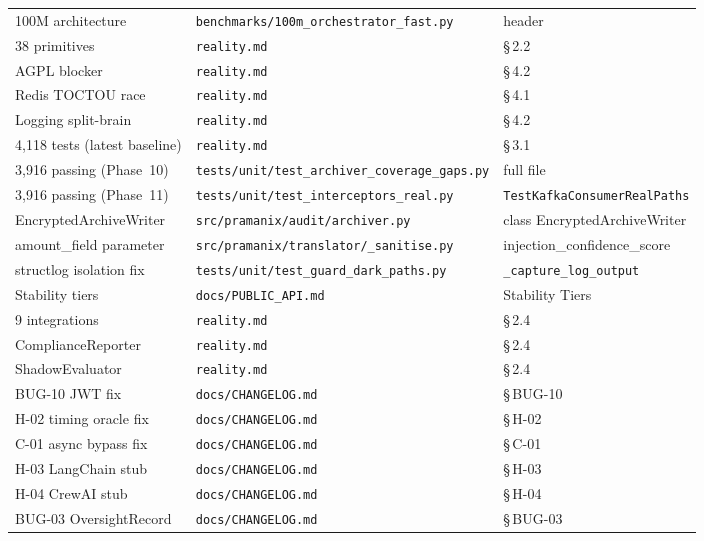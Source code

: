 \documentclass[12pt,a4paper,oneside]{report}
\newcommand{\fname}[1]{\texttt{#1}}          %
\newcommand{\code}[1]{\texttt{#1}}           %
\newcommand{\cfrsec}[1]{\S\,#1}             %
\begin{document}
\begin{longtable}{@{} p{5.5cm} p{5cm} p{3.5cm} @{}}
100M architecture           & \fname{benchmarks/100m\_orchestrator\_fast.py} & header \\
38 primitives               & \fname{reality.md}            & \cfrsec{2.2} \\
AGPL blocker                & \fname{reality.md}            & \cfrsec{4.2} \\
Redis TOCTOU race           & \fname{reality.md}            & \cfrsec{4.1} \\
Logging split-brain         & \fname{reality.md}            & \cfrsec{4.2} \\
4,118 tests (latest baseline)  & \fname{reality.md}            & \cfrsec{3.1} \\
3,916 passing (Phase~10)    & \fname{tests/unit/test\_archiver\_coverage\_gaps.py} & full file \\
3,916 passing (Phase~11)    & \fname{tests/unit/test\_interceptors\_real.py} & \code{TestKafkaConsumerRealPaths} \\
EncryptedArchiveWriter      & \fname{src/pramanix/audit/archiver.py} & class EncryptedArchiveWriter \\
amount\_field parameter     & \fname{src/pramanix/translator/\_sanitise.py} & injection\_confidence\_score \\
structlog isolation fix     & \fname{tests/unit/test\_guard\_dark\_paths.py} & \code{\_capture\_log\_output} \\
Stability tiers             & \fname{docs/PUBLIC\_API.md}   & Stability Tiers \\
9 integrations              & \fname{reality.md}            & \cfrsec{2.4} \\
ComplianceReporter          & \fname{reality.md}            & \cfrsec{2.4} \\
ShadowEvaluator             & \fname{reality.md}            & \cfrsec{2.4} \\
BUG-10 JWT fix              & \fname{docs/CHANGELOG.md}     & \cfrsec{BUG-10} \\
H-02 timing oracle fix      & \fname{docs/CHANGELOG.md}     & \cfrsec{H-02} \\
C-01 async bypass fix       & \fname{docs/CHANGELOG.md}     & \cfrsec{C-01} \\
H-03 LangChain stub         & \fname{docs/CHANGELOG.md}     & \cfrsec{H-03} \\
H-04 CrewAI stub            & \fname{docs/CHANGELOG.md}     & \cfrsec{H-04} \\
BUG-03 OversightRecord      & \fname{docs/CHANGELOG.md}     & \cfrsec{BUG-03} \\
\end{longtable}
\end{document}
